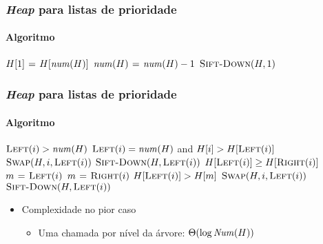 \documentclass{beamer}
\begin{document}
\begin{frame}
  \frametitle{\textit{Heap} para listas de prioridade}
  \framesubtitle{Algoritmo}

\begin{codebox}
\zi \Comment {}
\li $H[1] \gets H[\id{num}(H)]$
\li $\id{num}(H) \gets \id{num}(H) - 1$
\li $\textnormal{\scshape Sift-Down}(H, 1)$
    \End
\end{codebox}

\end{frame}

\begin{frame}
  \frametitle{\textit{Heap} para listas de prioridade}
  \framesubtitle{Algoritmo}

\begin{codebox}
\li \If $\proc{Left}(i) > \id{num}(H)$
\li   \Then \Return
\li   \ElseIf $\proc{Left}(i) = \id{num}(H)$ and $H[i] > H[\textnormal{\scshape Left}(i)]$
\li   \Then 
         $\textnormal{\scshape Swap}(H, i, \textnormal{\scshape Left}(i))$
\li      $\textnormal{\scshape Sift-Down}(H, \textnormal{\scshape Left}(i))$
\li   \ElseNoIf
\li       \If $H[\textnormal{\scshape Left}(i)] \ge H[\textnormal{\scshape Right}(i)]$
\li       \Then $m \mathrel{\hspace{1pt}=\hspace{1pt}} \textnormal{\scshape Left}(i)$
\li       \Else $m \mathrel{\hspace{1pt}=\hspace{1pt}} \textnormal{\scshape Right}(i)$
        \End
\li     \If $H[\textnormal{\scshape Left}(i)] > H[m]$
\li       \Then 
            $\textnormal{\scshape Swap}(H, i, \textnormal{\scshape Left}(i))$
\li         $\textnormal{\scshape Sift-Down}(H, \textnormal{\scshape Left}(i))$
          \End 
      \End
\end{codebox}  

\begin{itemize}
\item Complexidade no pior caso
\begin{itemize}
  \item Uma chamada por nível da árvore: $\Theta(\log \id{Num}(H))$
\end{itemize}
\end{itemize}
\end{frame}
\end{document}

